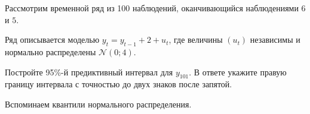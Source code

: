 
\begin{question}
Рассмотрим временной ряд из 100 наблюдений, оканчивающийся наблюдениями \(6\) и \(5\).

Ряд описывается моделью \(y_t = y_{t-1} + 2 + u_t\), где величины \((u_t)\) независимы
и нормально распределены \(\mathcal{N}(0; 4)\).

Постройте 95\%-й предиктивный интервал для \(y_{101}\).
В ответе укажите правую границу интервала с точностью до двух знаков после запятой.
\end{question}

\begin{solution}
Вспоминаем квантили нормального распределения.
\end{solution}

